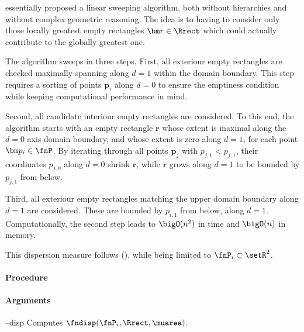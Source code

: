 
 essentially proposed a linear sweeping algorithm, both without hierarchies and without complex geometric reasoning. The idea is to having to consider only those locally greatest empty rectangles $\bm r \in \Rrect$ which could actually contribute to the globally greatest one. 

The algorithm sweeps in three steps. First, all exteriour empty rectangles are checked maximally spanning along $d=1$ within the domain boundary. This step requires a sorting of points $\bm p_i$ along $d=0$ to ensure the emptiness condition while keeping computational performance in mind.

Second, all candidate interiour empty rectangles are considered. To this end, the algorithm starts with an empty rectangle $\bm r$ whose extent is maximal along the $d=0$ axis domain boundary, and whose extent is zero along $d=1$, for each point $\bm p_i \in \fnP$. By iterating through all points $\bm p_j$ with $p_{j,1} < p_{j,1}$, their coordinates $p_{j,0}$ along $d=0$ shrink $\bm r$, while $\bm r$ grows along $d=1$ to be bounded by $p_{j,1}$ from below. 

Third, all exteriour empty rectangles matching the upper domain boundary along $d=1$ are considered. These are bounded by $p_{i,1}$ from below, along $d=1$. Computationally, the second step leads to $\bigO(n^2)$ in time and $\bigO(n)$ in memory. 

This dispersion measure follows (), while being limited to $\fnP_i \subset \setR^2$.

\paragraph{Procedure}

\begin{synopsis}
\end{synopsis}

\paragraph{Arguments}

\begin{procarg}{--disp}
  Computes $\fndisp(\fnP_i, \Rrect, \muarea)$.
\end{procarg}


